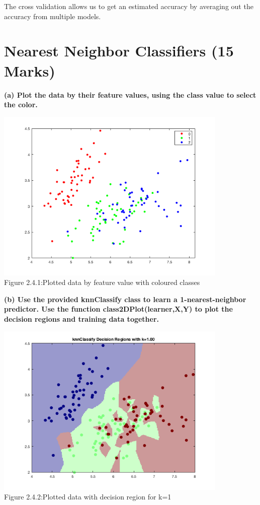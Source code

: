 \documentclass[]{scrreprt}   %
\begin{document}
{The cross validation allows us to get an estimated accuracy by averaging out the accuracy from multiple models.}

\section{Nearest Neighbor Classifiers (15 Marks)}
\textbf{(a) Plot the data by their feature values, using the class value to select the color.}
\begin{center}
	\includegraphics[width=30em,keepaspectratio]{p4figure1.png}\\
	{Figure 2.4.1:Plotted data by feature value with coloured classes}
\end{center} 
\textbf{(b) Use the provided knnClassify class to learn a 1-nearest-neighbor predictor. Use the function class2DPlot(learner,X,Y) to plot the decision regions and training data together.}
\begin{center}
	\includegraphics[width=30em,keepaspectratio]{p4figure2.png}\\
	{Figure 2.4.2:Plotted data with decision region for k=1}
\end{center} 
\end{document}
